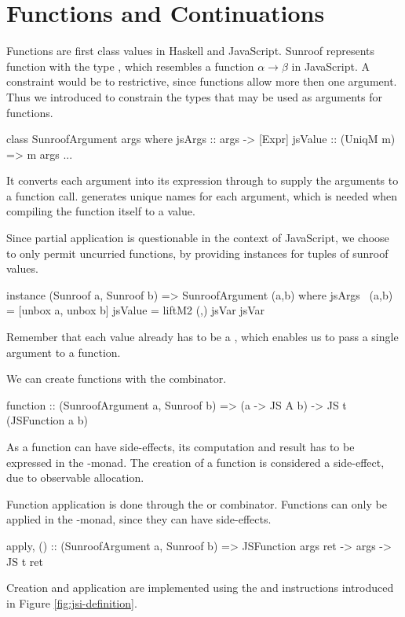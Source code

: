  
\section{Functions and Continuations}
\label{sec:functions-continuations}

Functions are first class values in Haskell and JavaScript.
Sunroof represents function with the type 
, which resembles 
a function $\alpha \rightarrow \beta$ in JavaScript. 
A  constraint would be to restrictive,
since functions allow more then one argument.
Thus we introduced  to constrain the 
types that may be used as arguments for functions.
\begin{Code}
class SunroofArgument args where
  jsArgs   :: args -> [Expr]
  jsValue  :: (UniqM m) => m args
  ...
\end{Code}
It converts each argument into its expression
through  to supply the
arguments to a function call.  generates
unique names for each argument, which is needed when compiling
the function itself to a value. 

Since partial application is questionable in
the context of JavaScript, we choose to only permit uncurried functions,
by providing instances for tuples of sunroof values.
\begin{Code}
instance (Sunroof a, Sunroof b) => SunroofArgument (a,b) where
  jsArgs ~(a,b) = [unbox a, unbox b]
  jsValue = liftM2 (,) jsVar jsVar
\end{Code}
Remember that each  value already has to be 
a , which enables us to pass a single argument
to a function. 

We can create functions with the  combinator.
\begin{Code}
function :: (SunroofArgument a, Sunroof b) 
         => (a -> JS A b)  -> JS t (JSFunction a b)
\end{Code}
As a function can have side-effects, its computation and result has to be 
expressed in the \JS-monad. The creation of a function is considered 
a side-effect, due to observable allocation.

Function application is done through 
the  or \Src{\$\$} combinator.
Functions can only be applied in the \JS-monad, since they can have side-effects.
\begin{Code}
apply, ($$) :: (SunroofArgument a, Sunroof b) 
            => JSFunction args ret -> args -> JS t ret
\end{Code}
Creation and application are implemented using the 
and  instructions introduced in 
Figure \ref{fig:jsi-definition}.

